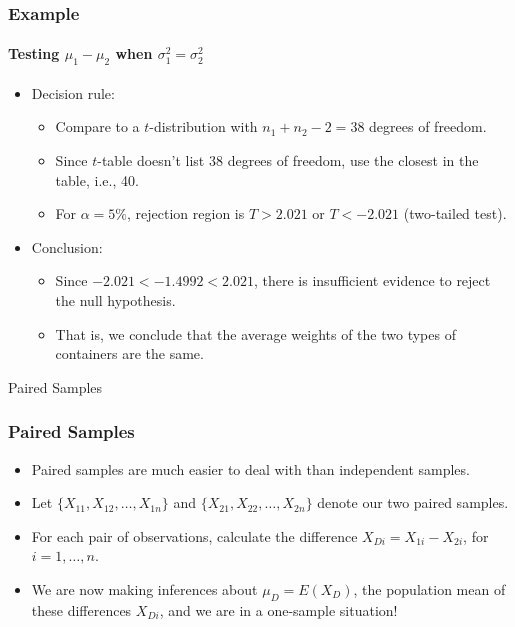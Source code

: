 \documentclass[12pt]{beamer}
\begin{document}
	\begin{frame}
		\frametitle{Example}
		\framesubtitle{Testing $\mu_1 - \mu_2$ when $\sigma_1^2 = \sigma_2^2$}
		
		\begin{itemize}[label={\color{blue}$\blacktriangleright$}]
			\item Decision rule:
			\begin{itemize}[label={\color{blue}$\blacktriangleright$}]
				\item Compare to a $t$-distribution with $n_1 + n_2 - 2 = 38$ degrees of freedom.
				\item Since $t$-table doesn't list 38 degrees of freedom, use the closest in the table, i.e., 40.
				\item For $\alpha = 5\%$, rejection region is $T > 2.021$ or $T < -2.021$ (two-tailed test).
			\end{itemize}
			\item Conclusion:
			\begin{itemize}[label={\color{blue}$\blacktriangleright$}]
				\item Since $-2.021 < -1.4992 < 2.021$, there is insufficient evidence to reject the null hypothesis.
				\item That is, we conclude that the average weights of the two types of containers are the same.
			\end{itemize}
		\end{itemize}
		
	\end{frame}
		\begin{frame}
				\vspace{1cm}
			\centering
			{\color{blue}\large Paired Samples}
			
				\end{frame}
	\begin{frame}
		\frametitle{Paired Samples}
		
		\begin{itemize}[label={\color{blue}$\blacktriangleright$}]
			\item Paired samples are much easier to deal with than independent samples.
			
			\item Let $\{X_{11}, X_{12}, \ldots, X_{1n}\}$ and $\{X_{21}, X_{22}, \ldots, X_{2n}\}$ denote our two paired samples.
			
			\item For each pair of observations, calculate the difference $X_{Di} = X_{1i} - X_{2i}$, for $i = 1, \ldots, n$.
			
			\item We are now making inferences about $\mu_D = E(X_D)$, the population mean of these differences $X_{Di}$, and we are in a one-sample situation!
		\end{itemize}
		
	\end{frame}
\end{document}
